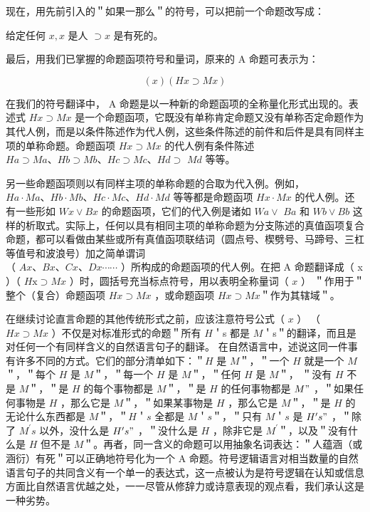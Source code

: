 现在，用先前引入的＂如果一那么＂的符号，可以把前一个命题改写成：

给定任何 $x, x$ 是人 $\supset x$ 是有死的。

最后，用我们已掌握的命题函项符号和量词，原来的 A 命题可表示为：

$$
(x)(H x \supset M x)
$$

在我们的符号翻译中， A 命题是以一种新的命题函项的全称量化形式出现的。表述式 $H x \supset M x$ 是一个命题函项，它既没有单称肯定命题又没有单称否定命题作为其代人例，而是以条件陈述作为代人例，这些条件陈述的前件和后件是具有同样主项的单称命题。命题函项 $H x \supset M x$ 的代人例有条件陈述 $H a \supset M a 、 H b \supset M b 、 H c \supset M c 、 H d \supset$ $M d$ 等等。

另一些命题函项则以有同样主项的单称命题的合取为代入例。例如， $H a \cdot M a 、 H b \cdot M b 、 H c \cdot M c 、 H d \cdot M d$ 等等都是命题函项 $H x \cdot M x$ 的代人例。还有一些形如 $W x \vee B x$ 的命题函项，它们的代入例是诸如 $W a \vee$ $B a$ 和 $W b \vee B b$ 这样的析取式。实际上，任何以具有相同主项的单称命题为分支陈述的真值函项复合命题，都可以看做由某些或所有真值函项联结词（圆点号、楔劈号、马蹄号、三杠等值号和波浪号）加之简单谓词\\
（ $A x 、 B x 、 C x 、 D x \cdots \cdots$ ）所构成的命题函项的代人例。在把 A 命题翻译成（ x ）（ $H \mathrm{x} \supset M x$ ）时，圆括号充当标点符号，用以表明全称量词（ $x$ ） ＂作用于＂整个（复合）命题函项 $H x \supset M x$ ，或命题函项 $H x \supset M x$＂作为其辖域＂。

在继续讨论直言命题的其他传统形式之前，应该注意符号公式（ $x$ ） （ $H x \supset M x$ ）不仅是对标准形式的命题＂所有 $H$＇s 都是 $M$＇s＂的翻译，而且是对任何一个有同样含义的自然语言句子的翻译。\cite{brown1954} 在自然语言中，述说这同一件事有许多不同的方式。它们的部分清单如下：＂$H$ 是 $M$＂，＂一个 $H$ 就是一个 $M$＂，＂每个 $H$ 是 $M$＂，＂每一个 $H$ 是 $M$＂，＂任何 $H$ 是 $M$＂， ＂没有 $H$ 不是 $M$＂，＂是 $H$ 的每个事物都是 $M$＂，＂是 $H$ 的任何事物都是 $M "$ ，＂如果任何事物是 $H$ ，那么它是 $M$＂，＂如果某事物是 $H$ ，那么它是 $M$＂，＂是 $H$ 的无论什么东西都是 $M$＂，＂$H$＇$s$ 全都是 $M$＇$s$＂，＂只有 $M$＇$s$ 是 $H^{\prime} s "$ ，＂除了 $M^{\prime} s$ 以外，没什么是 $H^{\prime} s "$ ，＂没什么是 $H$ ，除非它是 $M^{\prime}$＂，以及＂没有什么是 $H$ 但不是 $M$＂。再者，同一含义的命题可以用抽象名词表达：＂人蕴涵（或涵衍）有死＂可以正确地符号化为一个 A 命题。符号逻辑语言对相当数量的自然语言句子的共同含义有一个单一的表达式，这一点被认为是符号逻辑在认知或信息方面比自然语言优越之处，一一尽管从修辞力或诗意表现的观点看，我们承认这是一种劣势。

